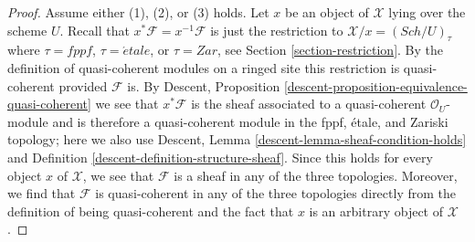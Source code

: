 \documentclass[10pt,a4paper]{amsart}
\theoremstyle{plain}
\theoremstyle{definition}
\theoremstyle{remark}
\numberwithin{equation}{subsection}
\def\Sch{\mathit{Sch}}
\def\etale{{\acute{e}tale}}
\begin{document}
\begin{proof}
Assume either (1), (2), or (3) holds.
Let $x$ be an object of $\mathcal{X}$ lying over the scheme $U$.
Recall that $x^*\mathcal{F} = x^{-1}\mathcal{F}$ is just the
restriction to $\mathcal{X}/x = (\Sch/U)_\tau$ where
$\tau = fppf$, $\tau = \etale$, or $\tau = Zar$, see
Section \ref{section-restriction}.
By the definition of quasi-coherent modules on a ringed site
this restriction is quasi-coherent provided $\mathcal{F}$ is.
By Descent, Proposition \ref{descent-proposition-equivalence-quasi-coherent}
we see that $x^*\mathcal{F}$ is the sheaf associated to
a quasi-coherent $\mathcal{O}_U$-module and is therefore
a quasi-coherent module in the fppf, \'etale, and Zariski
topology; here we also use
Descent, Lemma \ref{descent-lemma-sheaf-condition-holds} and
Definition \ref{descent-definition-structure-sheaf}.
Since this holds for every object $x$ of $\mathcal{X}$,
we see that $\mathcal{F}$ is a sheaf in any of the three topologies.
Moreover, we find that $\mathcal{F}$ is quasi-coherent in any
of the three topologies directly from the definition of being
quasi-coherent and the fact that $x$ is an arbitrary object of $\mathcal{X}$.
\end{proof}
\end{document}
